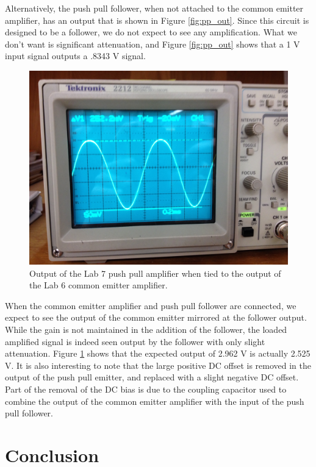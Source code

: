 \documentclass[12pt,letterpaper]{report}
\newlength \figwidth
\begin{document}
Alternatively, the push pull follower, when not attached to the common emitter amplifier, has an output that is shown in Figure \ref{fig:pp_out}. Since this circuit is designed to be a follower, we do not expect to see any amplification. What we don't want is significant attenuation, and Figure \ref{fig:pp_out} shows that a 1 V input signal outputs a .8343 V signal.

\begin{figure}[H]
\centering
\includegraphics[width=\figwidth, keepaspectratio=true]{lab7_images/pushpull_output.jpg}
\caption{Output of the Lab 7 push pull amplifier when tied to the output of the Lab 6 common emitter amplifier.}
\label{fig:pp_ce_out}
\end{figure}

When the common emitter amplifier and push pull follower are connected, we expect to see the output of the common emitter mirrored at the follower output. While the gain is not maintained in the addition of the follower, the loaded amplified signal is indeed seen output by the follower with only slight attenuation. Figure \ref{fig:pp_ce_out} shows that the expected output of 2.962 V is actually 2.525 V. It is also interesting to note that the large positive DC offset is removed in the output of the push pull emitter, and replaced with a slight negative DC offset. Part of the removal of the DC bias is due to the coupling capacitor used to combine the output of the common emitter amplifier with the input of the push pull follower.

\section*{Conclusion}
\end{document}
